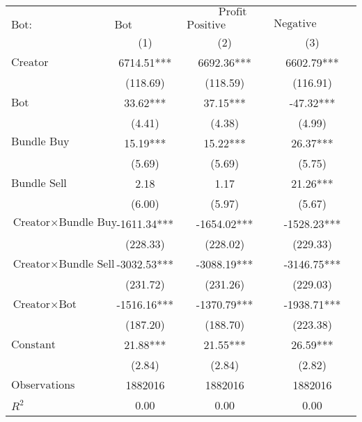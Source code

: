 \begin{tabular}{lccc}
\hline
 & \multicolumn{3}{c}{$\text{Profit}$} \\
 $\text{Bot}:$ & $\text{Bot Comment}$ & $\text{Positive Comment Bot}$ & $\text{Negative Comment Bot}$ \\
 & (1) & (2) & (3)\\
\hline
$\text{Creator}$ & 6714.51*** & 6692.36*** & 6602.79*** \\
 & (118.69) & (118.59) & (116.91) \\
$\text{Bot}$ & 33.62*** & 37.15*** & -47.32*** \\
 & (4.41) & (4.38) & (4.99) \\
$\text{Bundle Buy}$ & 15.19*** & 15.22*** & 26.37*** \\
 & (5.69) & (5.69) & (5.75) \\
$\text{Bundle Sell}$ & 2.18 & 1.17 & 21.26*** \\
 & (6.00) & (5.97) & (5.67) \\
$\text{Creator} \times \text{Bundle Buy}$ & -1611.34*** & -1654.02*** & -1528.23*** \\
 & (228.33) & (228.02) & (229.33) \\
$\text{Creator} \times \text{Bundle Sell}$ & -3032.53*** & -3088.19*** & -3146.75*** \\
 & (231.72) & (231.26) & (229.03) \\
$\text{Creator} \times \text{Bot}$ & -1516.16*** & -1370.79*** & -1938.71*** \\
 & (187.20) & (188.70) & (223.38) \\
$\text{Constant}$ & 21.88*** & 21.55*** & 26.59*** \\
 & (2.84) & (2.84) & (2.82) \\
$\text{Observations}$ & 1882016 & 1882016 & 1882016 \\
$R^2$ & 0.00 & 0.00 & 0.00 \\
\hline
\end{tabular}